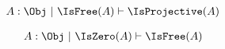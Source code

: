 \begin{sequent}
\begin{align*}
  A:\Obj ~|~ \IsFree( A ) \vdash \IsProjective( A )
\end{align*}
\end{sequent}

\begin{sequent}
\begin{align*}
  A:\Obj ~|~ \IsZero( A ) \vdash \IsFree( A )
\end{align*}
\end{sequent}